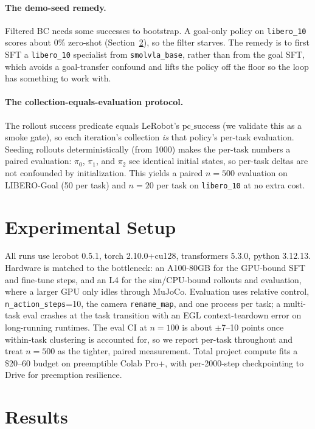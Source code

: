 \documentclass[11pt]{article}
\newcommand{\libgoal}{LIBERO-Goal}
\newcommand{\libten}{\texttt{libero\_10}}
\newcommand{\pcsucc}{\mathrm{pc\_success}}
\begin{document}
\paragraph{The demo-seed remedy.}
Filtered BC needs some successes to bootstrap. A goal-only policy on \libten{} scores about 0\%
zero-shot (Section~\ref{sec:results}), so the filter starves. The remedy is to first SFT a
\libten{} specialist from \texttt{smolvla\_base}, rather than from the goal SFT, which avoids a
goal-transfer confound and lifts the policy off the floor so the loop has something to work with.

\paragraph{The collection-equals-evaluation protocol.}
The rollout success predicate equals LeRobot's $\pcsucc$ (we validate this as a smoke gate), so
each iteration's collection \emph{is} that policy's per-task evaluation. Seeding rollouts
deterministically (from 1000) makes the per-task numbers a paired evaluation: $\pi_0$, $\pi_1$, and
$\pi_2$ see identical initial states, so per-task deltas are not confounded by initialization. This
yields a paired $n{=}500$ evaluation on \libgoal{} (50 per task) and $n{=}20$ per task on \libten{}
at no extra cost.

\section{Experimental Setup}
\label{sec:setup}

All runs use lerobot 0.5.1, torch 2.10.0+cu128, transformers 5.3.0, python 3.12.13. Hardware is
matched to the bottleneck: an A100-80GB for the GPU-bound SFT and fine-tune steps, and an L4 for the
sim/CPU-bound rollouts and evaluation, where a larger GPU only idles through MuJoCo. Evaluation uses
relative control, \texttt{n\_action\_steps}=10, the camera \texttt{rename\_map}, and one process per
task; a multi-task eval crashes at the task transition with an EGL context-teardown error on
long-running runtimes. The eval CI at $n{=}100$ is about $\pm$7--10 points once within-task
clustering is accounted for, so we report per-task throughout and treat $n{=}500$ as the tighter,
paired measurement. Total project compute fits a \$20--60 budget on preemptible Colab Pro+, with
per-2000-step checkpointing to Drive for preemption resilience.

\section{Results}
\label{sec:results}
\end{document}
